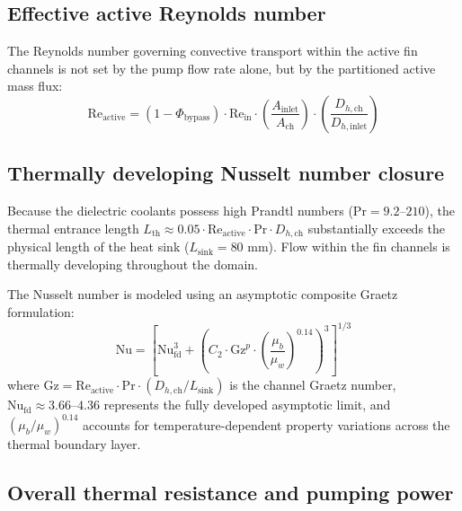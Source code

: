 \subsection{Effective active Reynolds number}
\label{sec:re_active}

The Reynolds number governing convective transport within the active fin channels is not set by the pump flow rate alone, but by the partitioned active mass flux:
\begin{equation}
\mathrm{Re}_{\mathrm{active}} = (1 - \Phi_{\mathrm{bypass}}) \cdot \mathrm{Re}_{\mathrm{in}} \cdot \left(\frac{A_{\mathrm{inlet}}}{A_{\mathrm{ch}}}\right) \cdot \left(\frac{D_{h,\mathrm{ch}}}{D_{h,\mathrm{inlet}}}\right)
\label{eq:re_active_def}
\end{equation}

\subsection{Thermally developing Nusselt number closure}
\label{sec:nu_closure}

Because the dielectric coolants possess high Prandtl numbers ($\mathrm{Pr} = 9.2\text{--}210$), the thermal entrance length $L_{\mathrm{th}} \approx 0.05 \cdot \mathrm{Re}_{\mathrm{active}} \cdot \mathrm{Pr} \cdot D_{h,\mathrm{ch}}$ substantially exceeds the physical length of the heat sink ($L_{\mathrm{sink}} = 80\text{ mm}$). Flow within the fin channels is thermally developing throughout the domain.

The Nusselt number is modeled using an asymptotic composite Graetz formulation:
\begin{equation}
\mathrm{Nu} = \left[ \mathrm{Nu}_{\mathrm{fd}}^3 + \left( C_2 \cdot \mathrm{Gz}^{p} \cdot \left(\frac{\mu_b}{\mu_w}\right)^{0.14} \right)^3 \right]^{1/3}
\label{eq:nu_composite}
\end{equation}
where $\mathrm{Gz} = \mathrm{Re}_{\mathrm{active}} \cdot \mathrm{Pr} \cdot (D_{h,\mathrm{ch}} / L_{\mathrm{sink}})$ is the channel Graetz number, $\mathrm{Nu}_{\mathrm{fd}} \approx 3.66\text{--}4.36$ represents the fully developed asymptotic limit, and $(\mu_b / \mu_w)^{0.14}$ accounts for temperature-dependent property variations across the thermal boundary layer.

\subsection{Overall thermal resistance and pumping power}
\label{sec:rth_and_fom}

